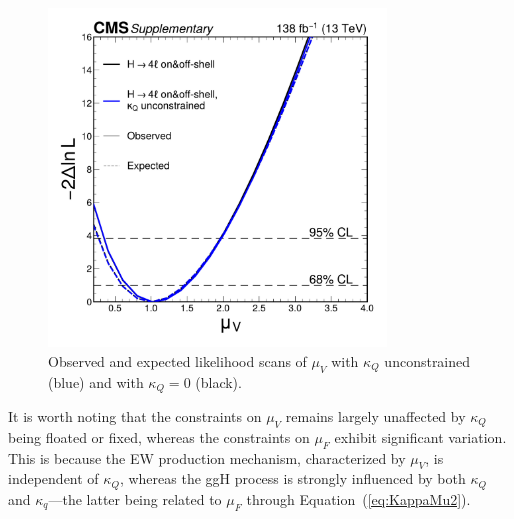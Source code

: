 \begin{figure}[!hbt]
    \centering
    \includegraphics[width=0.8\textwidth]{figures/observed_muV.pdf}
    \caption{Observed and expected likelihood scans of $\mu_V$ with $\kappa_Q$ unconstrained (blue) and with $\kappa_Q=0$ (black).}
    \label{fig:kappa_muV_scan}
\end{figure}

It is worth noting that the constraints on $\mu_V$ remains largely unaffected by $\kappa_Q$ being floated or fixed, whereas the constraints on $\mu_F$ exhibit significant variation. This is because the EW production mechanism, characterized by $\mu_V$, is independent of $\kappa_Q$, whereas the ggH process is strongly influenced by both $\kappa_Q$ and $\kappa_q$---the latter being related to $\mu_F$ through Equation~(\ref{eq:KappaMu2}).




